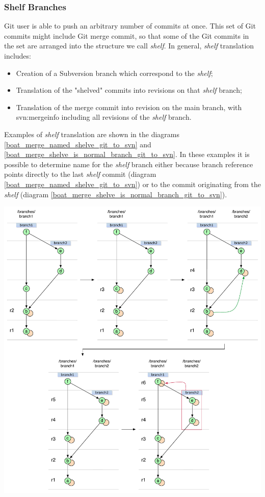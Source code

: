 \subsubsection{Shelf Branches}

Git user is able to push an arbitrary number of commits at once. This set of Git commits might include Git merge commit, 
so that some of the Git commits in the set are arranged into the structure we call \emph{shelf}. In general, \emph{shelf}
translation includes:
\begin{itemize}
\item Creation of a Subversion branch which correspond to the \emph{shelf};
\item Translation of the "shelved" commits into revisions on that \emph{shelf} branch;
\item Translation of the merge commit into revision on the main branch, with svn:mergeinfo including all revisions
of the \emph{shelf} branch.
\end{itemize}
Examples of \emph{shelf} translation are shown in the diagrams \ref{boat_merge_named_shelve_git_to_svn} and \ref{boat_merge_shelve_is_normal_branch_git_to_svn}.
In these examples it is possible to determine name for the \emph{shelf} branch either because branch reference points directly to the 
last \emph{shelf} commit (diagram \ref{boat_merge_named_shelve_git_to_svn}) or to the commit originating from the \emph{shelf} (diagram \ref{boat_merge_shelve_is_normal_branch_git_to_svn}).
\begin{center}
\includegraphics[width=\textwidth]{img/diagrams/boat_merge_named_shelve_git_to_svn.pdf}%
\label{boat_merge_named_shelve_git_to_svn}%
\end{center}

